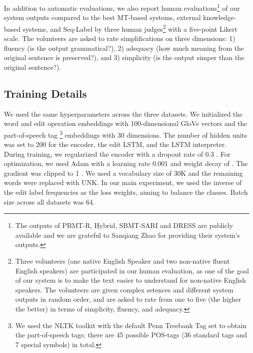 \documentclass[11pt,a4paper]{article}
\def\seqlabels{Seq-Label }
\begin{document}
In addition to automatic evaluations, we also report human evaluations\footnote{The outputs of PBMT-R, Hybrid, SBMT-SARI and DRESS are publicly available and we are grateful to Sanqiang Zhao for providing their system's outputs.} of our system outputs compared to the best MT-based systems, external knowledge-based systems, and \seqlabels by three human judges\footnote{Three volunteers (one native English Speaker and two non-native fluent English speakers) are participated in our human evaluation, as one of the goal of our system is to make the text easier to understand for non-native English speakers. The volunteers are given complex setences and different system outputs in random order, and are asked to rate from one to five (the higher the better) in terms of simplicity, fluency, and adequacy.} with a five-point Likert scale. The volunteers are asked to rate simplifications on three dimensions: 1) fluency (is the output grammatical?), 2) adequacy (how much meaning from the original sentence is preserved?), and 3) simplicity (is the output simper than the original sentence?).

\subsection{Training Details}
We used the same hyperparameters across the three datasets. We initialized the word and edit operation embeddings with
100-dimensional GloVe vectors \citep{pennington2014glove} and the part-of-speech tag \footnote{We used the NLTK toolkit with the default Penn Treebank Tag set to obtain the part-of-speech tags; there are 45 possible POS-tags (36 standard tags and 7 special symbols) in total.} embeddings with 30 dimensions. The number of hidden units was set to 200 for the encoder, the edit LSTM, and the LSTM interpreter. During
training, we regularized the encoder with a dropout rate of 0.3 \citep{srivastava2014dropout}. For optimization, we used Adam \citep{kingma2014adam} with a learning rate 0.001 and weight decay of . The gradient was clipped to 1 \citep{pascanu2013difficulty}. We used a vocabulary size of 30K and the remaining words were replaced with UNK. In our main experiment, we used the inverse of the edit label frequencies as the loss weights, aiming to balance the classes. 
Batch size across all datasets was 64. 
\end{document}
